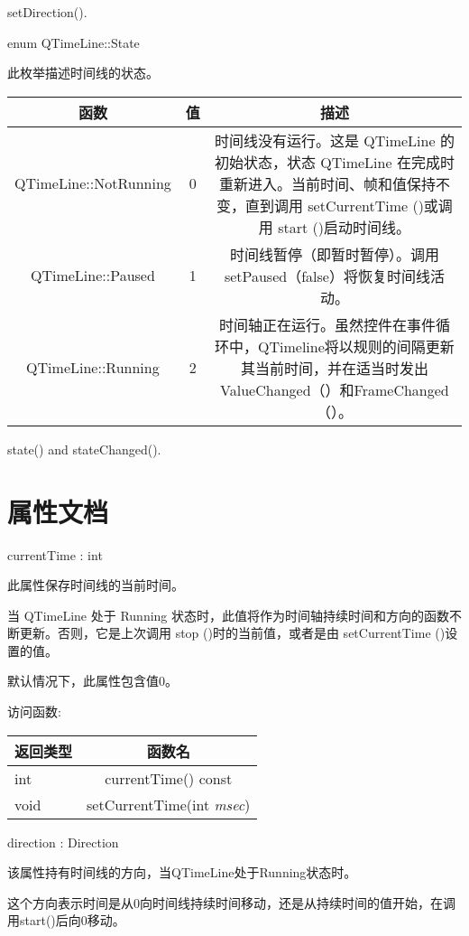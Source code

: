 \begin{seeAlso}
setDirection().
\end{seeAlso}

enum QTimeLine::State

此枚举描述时间线的状态。

\begin{tabular}{|c|c|c|}
\hline
函数 &	值 & 	描述 \\
\hline
QTimeLine::NotRunning &	0 &	时间线没有运行。这是 QTimeLine 的初始状态，状态 QTimeLine 在完成时重新进入。当前时间、帧和值保持不变，直到调用 setCurrentTime ()或调用 start ()启动时间线。\\
\hline
QTimeLine::Paused &	1 &	时间线暂停（即暂时暂停）。调用setPaused（false）将恢复时间线活动。 \\ 
\hline
QTimeLine::Running &	2 	&时间轴正在运行。虽然控件在事件循环中，QTimeline将以规则的间隔更新其当前时间，并在适当时发出ValueChanged（）和FrameChanged（）。\\
\hline
\end{tabular}

\begin{seeAlso}
state() and stateChanged().
\end{seeAlso}

\section{属性文档}

currentTime : int

此属性保存时间线的当前时间。

当 QTimeLine 处于 Running 状态时，此值将作为时间轴持续时间和方向的函数不断更新。否则，它是上次调用 stop ()时的当前值，或者是由 setCurrentTime ()设置的值。

默认情况下，此属性包含值0。

访问函数:


\begin{tabular}{|l|c|}
\hline
返回类型	& 函数名 \\ 
\hline
int &	currentTime() const \\ 
\hline
void& 	setCurrentTime(int \emph{msec}) \\ 
\hline
\end{tabular}

direction : Direction

该属性持有时间线的方向，当QTimeLine处于Running状态时。

这个方向表示时间是从0向时间线持续时间移动，还是从持续时间的值开始，在调用start()后向0移动。

